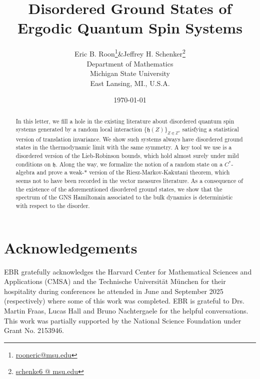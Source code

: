 \documentclass{article}
\newcommand{\Znu}{\mathbb{Z}^\nu}
\newcommand{\<}{\langle}
\renewcommand{\>}{\rangle}
\theoremstyle{definition}
\numberwithin{equation}{section}
\begin{document}
\title{\huge\textbf{Disordered Ground States of Ergodic Quantum Spin Systems}}
\author{Eric B. Roon\thanks{\url{rooneric@msu.edu}}\quad\&\quad Jeffrey H. Schenker\thanks{\url{schenke6 @ msu.edu}}\\Department of Mathematics\\ Michigan State University\\ East Lansing, MI., U.S.A.}
\date{\today}                     
\setcounter{Maxaffil}{0}
\renewcommand\Affilfont{\itshape\small}
\maketitle

\begin{abstract}
In this letter, we fill a hole in the existing literature about disordered quantum spin systems generated by a random local interaction $\{\mathfrak{h}(Z)\}_{Z\Subset \Znu}$ satisfying a statistical version of translation invariance. We show such systems always have disordered ground states in the thermodynamic limit with the same symmetry. A key tool we use is a disordered version of the Lieb-Robinson bounds, which hold almost surely under mild conditions on $\mathfrak{h}$. Along the way, we formalize the notion of a random state on a $C^*$-algebra and prove a weak-$\ast$ version of the Riesz-Markov-Kakutani theorem, which seems not to have been recorded in the vector measures literature. As a consequence of the existence of the aforementioned disordered ground states, we show that the spectrum of the GNS Hamiltonain associated to the bulk dynamics is deterministic with respect to the disorder. 
\end{abstract}

\tableofcontents
\section*{Acknowledgements}
EBR gratefully acknowledges the Harvard Center for Mathematical Sciences and Applications (CMSA) and the Technische Universit\"{a}t M\"{un}chen for their hospitality during conferences he attended in June and September 2025 (respectively) where some of this work was completed. EBR is grateful to Drs. Martin Fraas, Lucas Hall and Bruno Nachtergaele for the helpful conversations. This work was partially supported by the National Science Foundation under Grant No. 2153946.  
\end{document}
